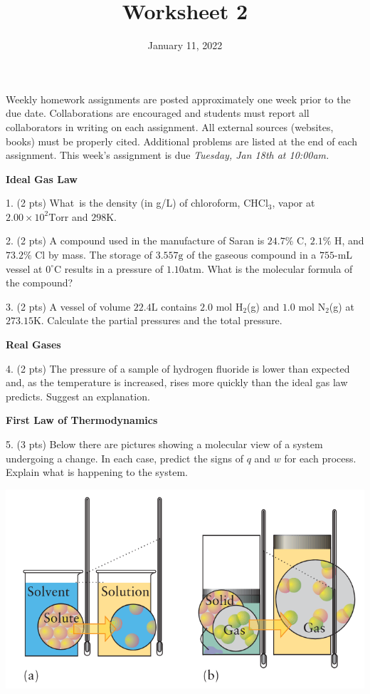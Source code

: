 \documentclass[11pt]{article}
\title{\textbf{Worksheet 2}}
\date{\vspace{-2em}January 11, 2022}
\begin{document}
\maketitle

Weekly homework assignments are posted approximately one week prior to the
due date. Collaborations are encouraged and students must report all collaborators
in writing on each assignment. All external sources (websites, books) must be
properly cited. Additional problems are listed at the end of each assignment.
This week's assignment is due \textit{Tuesday, Jan 18th at 10:00am.}

\textbf{Ideal Gas Law}

1. (2 pts) What\ is the density (in g/L) of chloroform, CHCl$_3$, vapor at
$2.00\times 10^2\text{Torr}$ and $298\text{K}$.

\vspace{1in}

2. (2 pts) A compound used in the manufacture of Saran is $24.7\%$ C, $2.1\%$ H, and
$73.2\%$ Cl by mass. The storage of $3.557\text{g}$ of the gaseous compound in
a $755$-mL vessel at $0^\circ\text{C}$ results in a pressure of $1.10\text{atm}$.
What is the molecular formula of the compound?


\vspace{1in}

3. (2 pts) A vessel of volume $22.4\text{L}$ contains $2.0$ mol H$_2$(g) and $1.0$ mol
N$_2$(g) at $273.15\text{K}$. Calculate the partial pressures and the total pressure.

\vspace{1in}

\textbf{Real Gases}

4. (2 pts) The pressure of a sample of hydrogen fluoride is lower than expected and, as the
temperature is increased, rises more quickly than the ideal gas law predicts.
Suggest an explanation.

\vspace{1in}

\textbf{First Law of Thermodynamics}

5. (3 pts) Below there are pictures showing a molecular view of a system
undergoing a change. In each case, predict the signs of $q$ and $w$ for
 each process. Explain what is happening to the system.

\begin{center}
  \includegraphics[scale=0.35]{phase_change.png}
\end{center}
\end{document}
